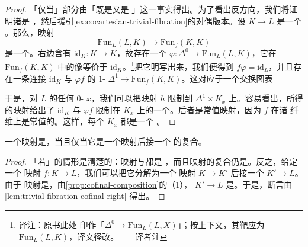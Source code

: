 \begin{proof}
「仅当」部分由「\trTrivialFibration{}既是\trRightFibration{}又是%
\trJoyalEquivalence{}」这一事实得出。为了看出反方向，我们将证明诸\trFibre{}是%
\trContractible{}，然后援引\cref{ex:cocartesian-trivial-fibration}的对偶版本。设 $K \to L$ 是一个%
\trCofinal{}\trRightFibration{}。那么，映射
\[
\mathrm{Fun}_L(L, K) \to \mathrm{Fun}_f(K, K)
\]
是一个\trEquivalence{}。右边含有\trFunctor{}%
$\mathrm{id}_K\colon K \to K$，故存在一个\trObject{}%
$\varphi\colon \Delta^0 \to \mathrm{Fun}_L(L, K)$，它在
$\mathrm{Fun}_f(K, K)$ 中的像等价于 $\mathrm{id}_K$。\footnote{译注：原书此处
印作「$\Delta^0 \to \mathrm{Fun}_L(L, X)$」；按上下文，其靶应为
$\mathrm{Fun}_L(L, K)$，译文径改。——译者注}把它明写出来，我们便得到
$f\varphi = \mathrm{id}_L$，并且存在一条连接 $\mathrm{id}_K$ 与 $\varphi f$
的 $1$-\trSimplex{} $\Delta^1 \to \mathrm{Fun}_f(K, K)$。这对应于一个交换图表
\begin{center}
\end{center}
于是，对 $L$ 的任何 $0$-\trSimplex{} $x$，我们可以把映射 $h$ 限制到
$\Delta^1 \times K_x$ 上。容易看出，所得的映射给出了 $\mathrm{id}_K$ 与
$\varphi f$ 限制在 $K_x$ 上的一个\trHomotopy{}。后者是常值映射，因为 $f$ 在诸
纤维上是常值的。这样，每个\trFibre{} $K_x$ 都是一个\trContractible{}%
\trKanComplex{}。
\end{proof}

\begin{proposition}\label{prop:cofinal-factorization}
一个映射是\trCofinal{}，当且仅当它是一个\trRightAnodyne{}映射后接一个%
\trTrivialFibration{}的复合。
\end{proposition}

\begin{proof}
「若」的情形是清楚的：\trRightAnodyne{}映射与\trTrivialFibration{}都是%
\trCofinal{}，而且\trCofinal{}映射的复合仍是\trCofinal{}。反之，给定一个%
\trCofinal{}映射 $f\colon K \to L$，我们可以把它分解为一个\trRightAnodyne{}%
映射 $K \to K'$ 后接一个\trRightFibration{} $K' \to L$。由于\trRightAnodyne{}%
映射是\trCofinal{}，由\cref{prop:cofinal-composition}的（1），\trRightFibration{}%
$K' \to L$ 是\trCofinal{}。于是，断言由\cref{lem:trivial-fibration-cofinal-right}
得出。
\end{proof}

